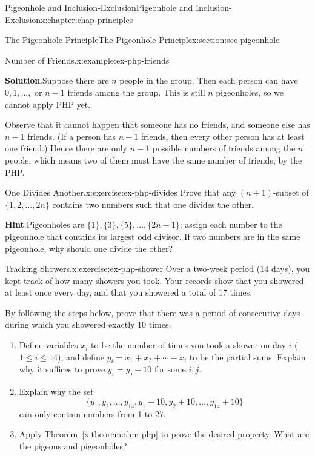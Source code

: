 \documentclass[oneside,10pt,]{book}
\newcommand{\blocktitlefont}{\relax}
\newcommand{\xreffont}{\relax}
\numberwithin{equation}{section}
\begin{document}
\begin{chapterptx}{Pigeonhole and Inclusion-Exclusion}{}{Pigeonhole and Inclusion-Exclusion}{}{}{x:chapter:chap-principles}
\begin{sectionptx}{The Pigeonhole Principle}{}{The Pigeonhole Principle}{}{}{x:section:sec-pigeonhole}
\begin{example}{Number of Friends.}{x:example:ex-php-friends}
\par\smallskip%
\noindent\textbf{\blocktitlefont Solution}.\hypertarget{g:solution:id477418}{}\quad{}Suppose there are \(n\) people in the group. Then each person can have \(0, 1, \ldots, \text{ or } n-1\) friends among the group. This is still \(n\) pigeonholes, so we cannot apply PHP yet.%
\par
Observe that it cannot happen that someone has no friends, and someone else has \(n-1\) friends. (If a person has \(n-1\) friends, then every other person has at least one friend.) Hence there are only \(n-1\) possible numbers of friends among the \(n\) people, which means two of them must have the same number of friends, by the PHP.%
\end{example}
\begin{inlineexercise}{One Divides Another.}{x:exercise:ex-php-divides}%
Prove that any \((n+1)\)-subset of \(\{1,2,\ldots,2n\}\) contains two numbers such that one divides the other.%
\par\smallskip%
\noindent\textbf{\blocktitlefont Hint}.\hypertarget{g:hint:id477517}{}\quad{}Pigeonholes are \(\{1\},\{3\},\{5\},\ldots,\{2n-1\}\); assign each number to the pigeonhole that contains its largest odd divisor. If two numbers are in the same pigeonhole, why should one divide the other?%
\end{inlineexercise}
\begin{inlineexercise}{Tracking Showers.}{x:exercise:ex-php-shower}%
Over a two-week period (14 days), you kept track of how many showers you took. Your records show that you showered at least once every day, and that you showered a total of 17 times.%
\par
By following the steps below, prove that there was a period of consecutive days during which you showered exactly 10 times.%
\begin{enumerate}[label=(\alph*)]
\item{}Define variables \(x_i\) to be the number of times you took a shower on day \(i\) (\(1 \leq i \leq 14\)), and define \(y_i = x_1 + x_2 + \cdots + x_i\) to be the partial sums. Explain why it suffices to prove \(y_i = y_j + 10\) for some \(i,j\).%
\item{}Explain why the set%
\begin{equation*}
\{y_1,y_2,\ldots,y_{14},y_1+10,y_2+10,\ldots,y_{14}+10\}
\end{equation*}
can only contain numbers from 1 to 27.%
\item{}Apply \hyperref[x:theorem:thm-php]{Theorem~{\xreffont\ref{x:theorem:thm-php}}} to prove the desired property. What are the pigeons and pigeonholes?%

\end{enumerate}
\end{inlineexercise}
\end{sectionptx}
\end{chapterptx}
\end{document}

